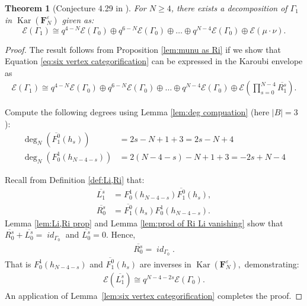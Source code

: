 \documentclass[12pt]{amsart}
\newtheorem{theorem}{Theorem}[section]
\theoremstyle{definition}
\theoremstyle{remark}
\numberwithin{equation}{section}
\numberwithin{figure}{section}
\newcommand{\Kar}{\operatorname{Kar}}
\newcommand{\Li}[2]{\overline{L^{#1}_{#2}}}
\newcommand{\Ri}[2]{\overline{R^{#1}_{#2}}}
\newcommand{\Foam}{\mathbf{F}_N}
\newcommand{\foamdeg}{\deg_N}
\DeclareMathOperator{\idfoam}{\mathit{id}}
\begin{document}
\begin{theorem}[Conjecture 4.29 in \cite{grlj20266valentvertexmathfrakglnweb}]
For $N \geq 4$, there exists a decomposition of $\Gamma_1$ in $\Kar(\Foam^{\varepsilon})$ given as: 
\[
 \mathcal{E}(\Gamma_1) \cong q^{4-N}\mathcal{E}(\Gamma_0) \oplus q^{6-N}\mathcal{E}(\Gamma_0)  \oplus \dots \oplus q^{N-4}\mathcal{E}(\Gamma_0) \oplus \mathcal{E}(\mu \cdot \nu).
\]
\end{theorem}
\begin{proof}
The result follows from Proposition \ref{lem:munu as Ri} if we show that Equation \eqref{eq:six vertex categorification} can be expressed in the Karoubi envelope as 
\begin{align}\label{eq:decategorification without munu}
     \mathcal{E}(\Gamma_1) \cong q^{4-N}\mathcal{E}(\Gamma_0) \oplus q^{6-N}\mathcal{E}(\Gamma_0)  \oplus \dots \oplus q^{N-4}\mathcal{E}(\Gamma_0) \oplus \mathcal{E}\left(\prod_{s = 0}^{N-4}  \Ri{s}{1} \right).
\end{align}

Compute the following degrees using Lemma \ref{lem:deg compuation} (here $|B| = 3$):
\begin{align*}
    \foamdeg(\overline{F_{1}^{0}}(h_s)) &= 2s - N +1 + 3 = 2s - N + 4\\
    \foamdeg(F_{0}^1(h_{N - 4-s} )) & = 2(N - 4-s) - N +1 + 3 = - 2s + N - 4
\end{align*}

Recall from Definition \ref{def:Li,Ri} that:
\begin{align*}
    \Li{s}{1}&= F_{0}^1(h_{N - 4-s} )\overline{F_{1}^{0}}(h_s), \\
    \Ri{s}{0} &=\overline{F_{1}^{0}}(h_s)F_{0}^1(h_{N - 4-s} ).
\end{align*}
Lemma \ref{lem:Li,Ri prop} and Lemma \ref{lem:prod of Ri Li vanishing} show that $\Ri{s}{0} + \Li{s}{0} = \idfoam_{\Gamma_0}$ and $\Li{s}{0} = 0$. Hence,
\begin{align*}
    \Ri{s}{0} = \idfoam_{\Gamma_0}.
\end{align*}
That is $F_{0}^1(h_{N - 4-s} )$ and $\overline{F_{1}^{0}}(h_s)$ are inverses in $\Kar(\Foam^\varepsilon),$ demonstrating:
\begin{align*}
    \mathcal E(\Li{s}{1}) \cong q^{N - 4 - 2s}\mathcal E (\Gamma_0).
\end{align*}
An application of Lemma~\ref{lem:six vertex categorification} completes the proof.
\end{proof}
\end{document}
